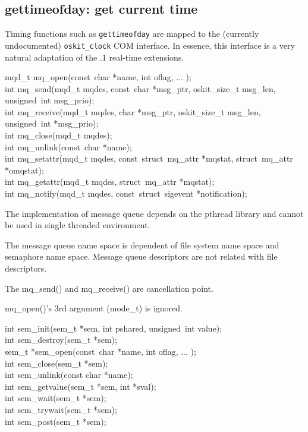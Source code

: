 \subsection{gettimeofday: get current time}
Timing functions such as \texttt{gettimeofday} are mapped to the (currently
undocumented) \texttt{oskit_clock} COM interface. In essence, this
interface is a very natural adaptation of the \posix{}.1 real-time
extensions.

\begin{apisyn}

  \funcproto mqd_t mq_open(const~char *name, int oflag, ... \unskip);\\
  \funcproto int mq_send(mqd_t mqdes, const~char *msg_ptr,
                         oskit_size_t msg_len, unsigned~int msg_prio);\\
  \funcproto int mq_receive(mqd_t mqdes, char *msg_ptr, oskit_size_t msg_len, unsigned~int *msg_prio);\\
  \funcproto int mq_close(mqd_t mqdes);\\
  \funcproto int mq_unlink(const~char *name);\\
  \funcproto int mq_setattr(mqd_t mqdes, const~struct~mq_attr *mqstat, struct~mq_attr *omqstat);\\
  \funcproto int mq_getattr(mqd_t mqdes, struct~mq_attr *mqstat);\\
  \funcproto int mq_notify(mqd_t mqdes, const~struct~sigevent *notification);
\end{apisyn}

\begin{apidesc}
  The implementation of \posix{} message queue depends on
  the pthread library and cannot be used in single threaded environment.

  The message queue name space is dependent of file system name space
  and semaphore name space.  Message queue descriptors are not related
  with file descriptors.  

  The mq_send() and mq_receive() are cancellation point.

  mq_open()'s 3rd argument (mode_t) is ignored.

\end{apidesc}

\begin{apisyn}

  \funcproto int sem_init(sem_t *sem, int pshared, unsigned~int value);\\
  \funcproto int sem_destroy(sem_t *sem);\\
  \funcproto sem_t *sem_open(const~char *name, int oflag, ... \unskip);\\
  \funcproto int sem_close(sem_t *sem);\\
  \funcproto int sem_unlink(const char *name);\\
  \funcproto int sem_getvalue(sem_t *sem, int *sval);\\
  \funcproto int sem_wait(sem_t *sem);\\
  \funcproto int sem_trywait(sem_t *sem);\\
  \funcproto int sem_post(sem_t *sem);
\end{apisyn}

